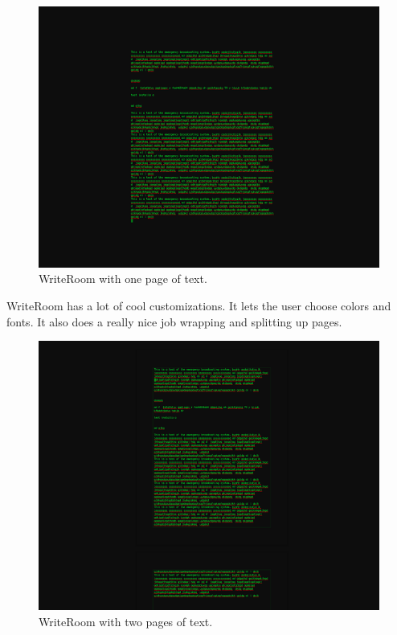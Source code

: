 \documentclass[10pt]{article}
\begin{document}
\begin{figure}
   \centering
      \includegraphics[width=130mm]{images/writeroom1.png}
   \caption{WriteRoom with one page of text.}
\end{figure}

WriteRoom has a lot of cool customizations. It lets the user choose colors and fonts. It also does a really nice job wrapping and splitting up pages.

\begin{figure}
   \centering
      \includegraphics[width=130mm]{images/writeroom2.png}
   \caption{WriteRoom with two pages of text.}
\end{figure}
\end{document}
